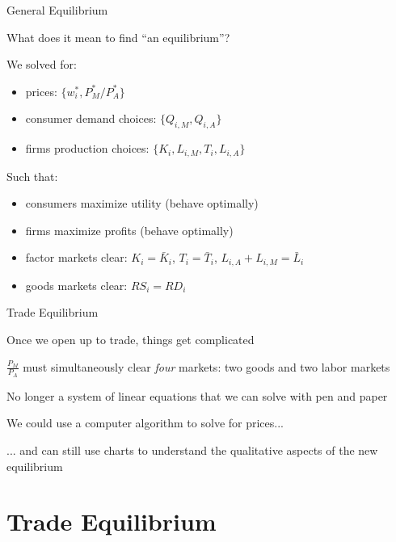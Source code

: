 \documentclass[notes,11pt, aspectratio=169, xcolor=table]{beamer}
\newenvironment{wideitemize}{\itemize\addtolength{\itemsep}{10pt}}{\enditemize}
\begin{document}
\begin{frame}{General Equilibrium}
\begin{wideitemize}
    \item What does it mean to find ``an equilibrium''?

    \item<2-> We solved for:
    \begin{itemize}
        \item prices: $\{w_i^*, P_M^*/P_A^*\}$
        \item consumer demand choices: $\{Q_{i,M}, Q_{i,A}\}$
        \item firms production choices: $\{K_{i}, L_{i,M}, T_{i}, L_{i,A}\}$
    \end{itemize}

    \item<3-> Such that:
    \begin{itemize}
        \item consumers maximize utility (behave optimally)
        \item firms maximize profits (behave optimally)
        \item factor markets clear: $K_i=\bar{K}_i$, $T_i=\bar{T}_i$, $L_{i,A} + L_{i,M} =\bar{L}_i$ 
        \item goods markets clear: $RS_{i} = RD_{i}$
    \end{itemize}    
    
\end{wideitemize}
\end{frame}

\begin{frame}{Trade Equilibrium}
\begin{wideitemize}
    \item Once we open up to trade, things get complicated
    \item $\frac{P_M}{P_A}$ must simultaneously clear \emph{four} markets: two goods and two labor markets
    \item No longer a system of linear equations that we can solve with pen and paper
    \item We could use a computer algorithm to solve for prices...
    \item ... and can still use charts to understand the qualitative aspects of the new equilibrium
    
\end{wideitemize}
\end{frame}

\section{Trade Equilibrium}
\end{document}
